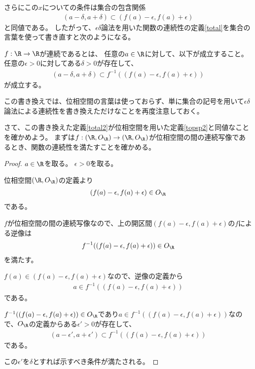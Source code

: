 \documentclass[uplatex]{jsarticle}
\begin{document}
さらにこの$x$についての条件は集合の包含関係
\begin{align*}
  (a-\delta,a+\delta)\subset(f(a)-\epsilon,f(a)+\epsilon)
\end{align*}
と同値である。
したがって、$\epsilon\delta$論法を用いた関数の連続性の定義\ref{total}を集合の言葉を使って書き直すと次のようになる。

\begin{dfn}[関数の連続性]\label{total2}
  $f:\R\to\R$が連続であるとは、
  任意の$a\in\R$に対して、以下が成立すること。
  任意の$\epsilon>0$に対してある$\delta>0$が存在して、
  \begin{align*}
    (a-\delta,a+\delta)\subset f^{-1}((f(a)-\epsilon,f(a)+\epsilon))
  \end{align*}
  が成立する。
\end{dfn}

この書き換えでは、位相空間の言葉は使っておらず、単に集合の記号を用いて$\epsilon\delta$論法による連続性を書き換えただけなことを再度注意しておく。

さて、この書き換えた定義\ref{total2}が位相空間を用いた定義\ref{topsp2}と同値なことを確かめよう。
まずは$f:(\R,O_\R)\to(\R,O_\R)$が位相空間の間の連続写像であるとき、関数の連続性を満たすことを確かめる。

\begin{proof}
  $a\in\R$を取る。
  $\epsilon>0$を取る。
  
  位相空間$(\R,O_\R)$の定義より
  \begin{align*}
    (f(a)-\epsilon,f(a)+\epsilon)\in O_\R
  \end{align*}
  である。
  
  $f$が位相空間の間の連続写像なので、上の開区間$(f(a)-\epsilon,f(a)+\epsilon)$の$f$による逆像は
  \begin{align*}
    f^{-1}((f(a)-\epsilon,f(a)+\epsilon))\in O_\R
  \end{align*}
  を満たす。
  
  $f(a)\in(f(a)-\epsilon,f(a)+\epsilon)$なので、逆像の定義から
  \begin{align*}
    a\in f^{-1}((f(a)-\epsilon,f(a)+\epsilon))
  \end{align*}
  である。
  
  $f^{-1}((f(a)-\epsilon,f(a)+\epsilon))\in O_\R$であり$a\in f^{-1}((f(a)-\epsilon,f(a)+\epsilon))$なので、$O_\R$の定義からある$\epsilon'>0$が存在して、
  \begin{align*}
    (a-\epsilon',a+\epsilon')\subset f^{-1}((f(a)-\epsilon,f(a)+\epsilon))
  \end{align*}
  である。

  この$\epsilon'$を$\delta$とすれば示すべき条件が満たされる。
\end{proof}
\end{document}
